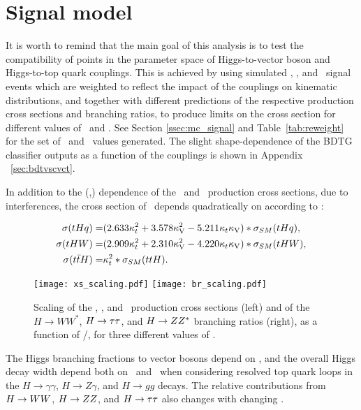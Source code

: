 
\section{Signal model}

It is worth to remind that the main goal of this analysis is to test the compatibility of points in the parameter space of Higgs-to-vector boson and Higgs-to-top quark couplings. This is achieved by using simulated \tHq, \tHW, and \ttH\ signal events which are weighted to reflect the impact of the couplings on kinematic distributions, and together with different predictions of the respective production cross sections and branching ratios, to produce limits on the cross section for different values of \CV\ and \Ct. See Section \ref{ssec:mc_signal} and Table~\ref{tab:reweight} for the set of \Ct\ and \CV\ values generated. The slight shape-dependence of the BDTG classifier outputs as a function of the couplings is shown in Appendix ~\ref{sec:bdtvscvct}.

In addition to the (\Ct,\CV) dependence of the \tHq\ and \tHW\ production cross sections, due to interferences, the cross section of \ttH\ depends quadratically on \Ct according to \cite{kcouplings}:

\begin{align}
\sigma(tHq) =& (2.633 \kappa_t^2 + 3.578 \kappa_\text{V}^2 - 5.211 \kappa_t\kappa_\text{V}) * \sigma_{SM}(tHq),\\
\sigma(tHW) =& (2.909 \kappa_t^2 + 2.310 \kappa_\text{V}^2 - 4.220 \kappa_t\kappa_\text{V}) * \sigma_{SM}(tHW),\\
\sigma(t\bar{t}H) =& \kappa_t^2 * \sigma_{SM}(ttH).
\end{align}

\begin{figure} [!h]
 \centering
  \texttt{[image: xs\_scaling.pdf]}
  \texttt{[image: br\_scaling.pdf]}
\caption[Scaling of the \tHq, \tHW, and \ttH\ production cross section  with \Ct/\CV.]{Scaling of the \tHq, \tHW, and \ttH\ production cross sections (left) and of the $H\to WW^*$, $H\to\tau\tau$, and $H\to ZZ^*$ branching ratios (right), as a function of \Ct/\CV, for three different values of \CV.}
\label{fig:xsbrscalings}
\end{figure}

The Higgs branching fractions to vector bosons depend on \CV, and the overall Higgs decay width depend both on \Ct\ and \CV\ when considering resolved top quark loops in the $H\to\gamma\gamma$, $H\to Z\gamma$, and $H\to gg$ decays. The relative contributions from $ H\to WW$, $H\to ZZ$, and $H\to\tau\tau$ also changes with changing \CV.

